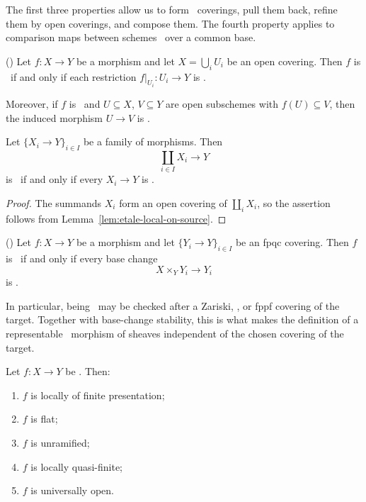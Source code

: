\begin{remark}
	The first three properties allow us to form
	\etale\ coverings, pull them back, refine them
	by open coverings, and compose them.
	The fourth property applies to comparison maps
	between schemes \etale\ over a common base.
\end{remark}

\begin{lemma}
	\label{lem:etale-local-on-source}
	(\cite[][Tag 02GJ]{stacks-project})
	Let $f:X\to Y$ be a morphism and let
	$X=\bigcup_i U_i$ be an open covering.
	Then $f$ is \etale\ if and only if each
	restriction $f|_{U_i}:U_i\to Y$ is \etale.
	
	Moreover, if $f$ is \etale\ and $U\subseteq X$,
	$V\subseteq Y$ are open subschemes with
	$f(U)\subseteq V$, then the induced morphism
	$U\to V$ is \etale.
\end{lemma}

\begin{corollary}
	\label{cor:etale-disjoint-union}
	Let $\{X_i\to Y\}_{i\in I}$ be a family of
	morphisms. Then
	\[
	\coprod_{i\in I}X_i\longrightarrow Y
	\]
	is \etale\ if and only if every $X_i\to Y$
	is \etale.
\end{corollary}

\begin{proof}
	The summands $X_i$ form an open covering of
	$\coprod_i X_i$, so the assertion follows from
	Lemma~\ref{lem:etale-local-on-source}.
\end{proof}

\begin{lemma}
	\label{lem:etale-local-on-target}
	(\cite[][Tag 02VN]{stacks-project})
	Let $f:X\to Y$ be a morphism and let
	$\{Y_i\to Y\}_{i\in I}$ be an fpqc covering.
	Then $f$ is \etale\ if and only if every
	base change
	\[
	X\times_Y Y_i\longrightarrow Y_i
	\]
	is \etale.
\end{lemma}

\begin{remark}
	In particular, being \etale\ may be checked after
	a Zariski, \etale, or fppf covering of the target.
	Together with base-change stability, this is what
	makes the definition of a representable \etale\
	morphism of sheaves independent of the chosen
	covering of the target.
\end{remark}

\begin{lemma}
	\label{lem:etale-consequences}
	Let $f:X\to Y$ be \etale. Then:
	\begin{enumerate}
		\item $f$ is locally of finite presentation;
		\item $f$ is flat;
		\item $f$ is unramified;
		\item $f$ is locally quasi-finite;
		\item $f$ is universally open.
	\end{enumerate}
\end{lemma}

